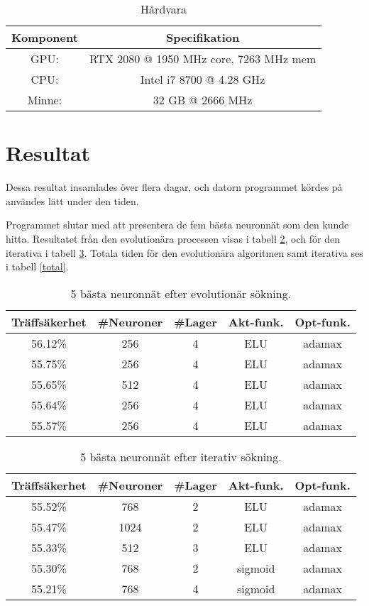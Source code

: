 \documentclass[a4paper, 12pt]{article}
\begin{document}
\begin{table}[htb]
    \centering
    \begin{tabular}{c|c}
      Komponent & Specifikation \\
      \hline
      GPU: & RTX 2080 @ 1950 MHz core, 7263 MHz mem \\
      CPU: & Intel i7 8700 @ 4.28 GHz \\
      Minne: & 32 GB @ 2666 MHz \\
    \end{tabular}
    \caption{Hårdvara}
    \label{hårdvara}
\end{table}

  \section{Resultat}

  Dessa resultat insamlades över flera dagar, och datorn programmet kördes på användes lätt under den tiden.

  Programmet slutar med att presentera de fem bästa neuronnät som den kunde hitta. Resultatet från den evolutionära processen visas i tabell \ref{evo}, och för den iterativa i tabell \ref{iterativ}. Totala tiden för den evolutionära algoritmen samt iterativa ses i tabell \ref{total}.

\begin{table}[htb]
    \centering
    \begin{tabular}{c|c|c|c|c}
      Träffsäkerhet & \#Neuroner & \#Lager & Akt-funk. & Opt-funk. \\
      \hline
      56.12\% & 256 & 4 & ELU & adamax \\
      55.75\% & 256 & 4 & ELU & adamax \\
      55.65\% & 512 & 4 & ELU & adamax \\
      55.64\% & 256 & 4 & ELU & adamax \\
      55.57\% & 256 & 4 & ELU & adamax \\
    \end{tabular}
    \caption{5 bästa neuronnät efter evolutionär sökning.}
    \label{evo}
\end{table}

\begin{table}[htb]
    \centering
    \begin{tabular}{c|c|c|c|c}
        Träffsäkerhet & \#Neuroner & \#Lager & Akt-funk. & Opt-funk. \\
        \hline
        55.52\% & 768 & 2 & ELU & adamax \\
        55.47\% & 1024 & 2 & ELU & adamax \\
        55.33\% & 512 & 3 & ELU & adamax \\
        55.30\% & 768 & 2 & sigmoid & adamax \\
        55.21\% & 768 & 4 & sigmoid & adamax \\
    \end{tabular}
    \caption{5 bästa neuronnät efter iterativ sökning.}
    \label{iterativ}
\end{table}
\end{document}
